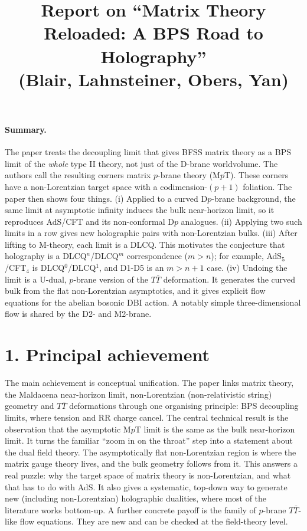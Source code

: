 \documentclass[11pt]{article}
\title{Report on ``Matrix Theory Reloaded: A BPS Road to Holography''\\\large (Blair, Lahnsteiner, Obers, Yan)}
\date{}
\begin{document}
\maketitle

\paragraph{Summary.}
The paper treats the decoupling limit that gives BFSS matrix theory as a BPS limit of the \emph{whole} type II theory, not just of the D-brane worldvolume. The authors call the resulting corners matrix $p$-brane theory (M$p$T). These corners have a non-Lorentzian target space with a codimension-$(p+1)$ foliation. The paper then shows four things. (i) Applied to a curved D$p$-brane background, the same limit at asymptotic infinity induces the bulk near-horizon limit, so it reproduces AdS/CFT and its non-conformal D$p$ analogues. (ii) Applying two such limits in a row gives new holographic pairs with non-Lorentzian bulks. (iii) After lifting to M-theory, each limit is a DLCQ. This motivates the conjecture that holography is a DLCQ$^n$/DLCQ$^m$ correspondence ($m>n$); for example, AdS$_5$/CFT$_4$ is DLCQ$^0$/DLCQ$^1$, and D1-D5 is an $m>n+1$ case. (iv) Undoing the limit is a U-dual, $p$-brane version of the $T\bar T$ deformation. It generates the curved bulk from the flat non-Lorentzian asymptotics, and it gives explicit flow equations for the abelian bosonic DBI action. A notably simple three-dimensional flow is shared by the D2- and M2-brane.

\section*{1. Principal achievement}
The main achievement is conceptual unification. The paper links matrix theory, the Maldacena near-horizon limit, non-Lorentzian (non-relativistic string) geometry and $T\bar T$ deformations through one organising principle: BPS decoupling limits, where tension and RR charge cancel. The central technical result is the observation that the asymptotic M$p$T limit is the same as the bulk near-horizon limit. It turns the familiar ``zoom in on the throat'' step into a statement about the dual field theory. The asymptotically flat non-Lorentzian region is where the matrix gauge theory lives, and the bulk geometry follows from it. This answers a real puzzle: why the target space of matrix theory is non-Lorentzian, and what that has to do with AdS. It also gives a systematic, top-down way to generate new (including non-Lorentzian) holographic dualities, where most of the literature works bottom-up. A further concrete payoff is the family of $p$-brane $T\bar T$-like flow equations. They are new and can be checked at the field-theory level.
\end{document}
